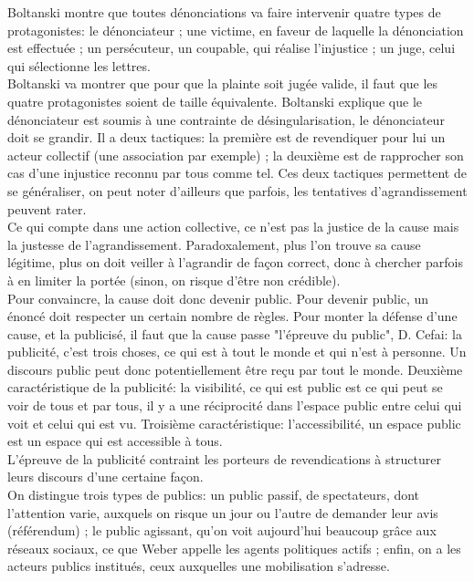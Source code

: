 \documentclass[10pt, a4paper, openany]{book}
\begin{document}
Boltanski montre que toutes dénonciations va faire intervenir quatre types de protagonistes: le dénonciateur ; une victime, en faveur de laquelle la dénonciation est effectuée ; un persécuteur, un coupable, qui réalise l'injustice ; un juge, celui qui sélectionne les lettres. \\
Boltanski va montrer que pour que la plainte soit jugée valide, il faut que les quatre protagonistes soient de taille équivalente. Boltanski explique que le dénonciateur est soumis à une contrainte de désingularisation, le dénonciateur doit se grandir. Il a deux tactiques: la première est de revendiquer pour lui un acteur collectif (une association par exemple) ; la deuxième est de rapprocher son cas d'une injustice reconnu par tous comme tel. Ces deux tactiques permettent de se généraliser, on peut noter d'ailleurs que parfois, les tentatives d'agrandissement peuvent rater. \\
Ce qui compte dans une action collective, ce n'est pas la justice de la cause mais la justesse de l'agrandissement. Paradoxalement, plus l'on trouve sa cause légitime, plus on doit veiller à l'agrandir de façon correct, donc à chercher parfois à en limiter la portée (sinon, on risque d'être non crédible). \\
Pour convaincre, la cause doit donc devenir public. Pour devenir public, un énoncé doit respecter un certain nombre de règles. Pour monter la défense d'une cause, et la publicisé, il faut que la cause passe "l'épreuve du public", D. Cefai: la publicité, c'est trois choses, ce qui est à tout le monde et qui n'est à personne. Un discours public peut donc potentiellement être reçu par tout le monde. Deuxième caractéristique de la publicité: la visibilité, ce qui est public est ce qui peut se voir de tous et par tous, il y a une réciprocité dans l'espace public entre celui qui voit et celui qui est vu. Troisième caractéristique: l'accessibilité, un espace public est un espace qui est accessible à tous. \\
L'épreuve de la publicité contraint les porteurs de revendications à structurer leurs discours d'une certaine façon. \\
On distingue trois types de publics: un public passif, de spectateurs, dont l'attention varie, auxquels on risque un jour ou l'autre de demander leur avis (référendum) ; le public agissant, qu'on voit aujourd'hui beaucoup grâce aux réseaux sociaux, ce que Weber appelle les agents politiques actifs ; enfin, on a les acteurs publics institués, ceux auxquelles une mobilisation s'adresse. 
\end{document}
